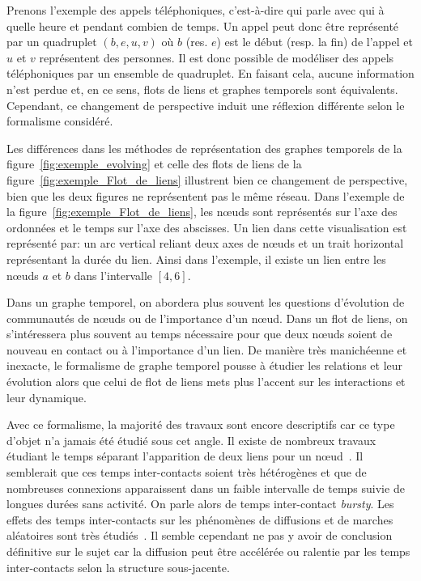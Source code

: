 Prenons l'exemple des appels téléphoniques, c'est-à-dire qui parle avec qui à quelle heure et pendant combien de temps.
Un appel peut donc être représenté par un quadruplet $(b,e,u,v)$ où $b$ (res. $e$) est le début (resp. la fin) de l'appel et $u$ et $v$ représentent des personnes.
Il est donc possible de modéliser des appels téléphoniques par un ensemble de quadruplet.
En faisant cela, aucune information n'est perdue et, en ce sens, flots de liens et graphes temporels sont équivalents. 
Cependant, ce changement de perspective induit une réflexion différente selon le formalisme considéré.

Les différences dans les méthodes de représentation des graphes temporels de la figure~\ref{fig:exemple_evolving} et celle des flots de liens de la figure~\ref{fig:exemple_Flot_de_liens} illustrent bien ce changement de perspective, bien que les deux figures ne représentent pas le même réseau.
Dans l'exemple de la figure~\ref{fig:exemple_Flot_de_liens}, les n\oe uds sont représentés sur l'axe des ordonnées et le temps sur l'axe des abscisses.
Un lien dans cette visualisation est représenté par: un arc vertical reliant deux axes de n\oe uds et un trait horizontal représentant la durée du lien.
Ainsi dans l'exemple, il existe un lien entre les n\oe uds $a$ et $b$ dans l'intervalle $[4,6]$.

Dans un graphe temporel, on abordera plus souvent les questions d'évolution de communautés de n\oe uds ou de l'importance d'un n\oe ud.
Dans un flot de liens, on s'intéressera plus souvent au temps nécessaire pour que deux n\oe uds soient de nouveau en contact ou à l'importance d'un lien.
De manière très manichéenne et inexacte, le formalisme de graphe temporel pousse à étudier les relations et leur évolution alors que celui de flot de liens mets plus l'accent sur les interactions et leur dynamique.

\bigskip



Avec ce formalisme, la majorité des travaux sont encore descriptifs car ce type d'objet n'a jamais été étudié sous cet angle.
Il existe de nombreux travaux étudiant le temps séparant l'apparition de deux liens pour un n\oe ud~\cite{Malmgren2008,Malmgren2009}.
Il semblerait que ces temps inter-contacts soient très hétérogènes et que de nombreuses connexions apparaissent dans un faible intervalle de temps suivie de longues durées sans activité.
On parle alors de temps inter-contact \emph{bursty}.
Les effets des temps inter-contacts sur les phénomènes de diffusions et de marches aléatoires sont très étudiés~\cite{Karsai2011,Karsai2012a,Starnini2012b,Rocha2013}.
Il semble cependant ne pas y avoir de conclusion définitive sur le sujet car la diffusion peut être accélérée ou ralentie par les temps inter-contacts selon la structure sous-jacente.

